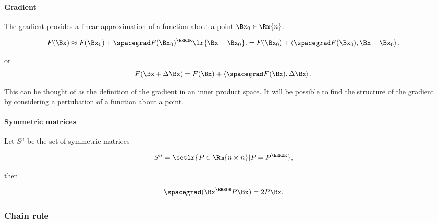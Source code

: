 
\paragraph{Gradient}

The gradient provides a linear approximation of a function about a point \( \Bx_0 \in \Rm{n} \).

\begin{dmath}\label{eqn:convex-optimizationLecture2:484}
F(\Bx)
\approx F(\Bx_0) + \spacegrad F(\Bx_0)^\T \lr{ \Bx - \Bx_0 }.
=
F(\Bx_0) + \innerproduct{ \spacegrad F(\Bx_0)}{ \Bx - \Bx_0 },
\end{dmath}

or
\begin{equation}\label{eqn:convex-optimizationLecture2:504}
F(\Bx + \Delta \Bx)
=
F(\Bx) + \innerproduct{ \spacegrad F(\Bx)}{ \Delta \Bx }.
\end{equation}

This can be thought of as the definition of the gradient in an inner product space.  It will be possible to find the structure of the gradient by considering a pertubation of a function about a point.



\paragraph{Symmetric matrices}

Let \( S^n \) be the set of symmetric matrices

\begin{equation}\label{eqn:convex-optimizationLecture2:444}
S^n = \setlr{ P \in \Rm{n\times n} | P = P^\T},
\end{equation}

then

\begin{dmath}\label{eqn:convex-optimizationLecture2:464}
\spacegrad (\Bx^\T P \Bx) = 2 P \Bx.
\end{dmath}

\subsubsection{Chain rule}

